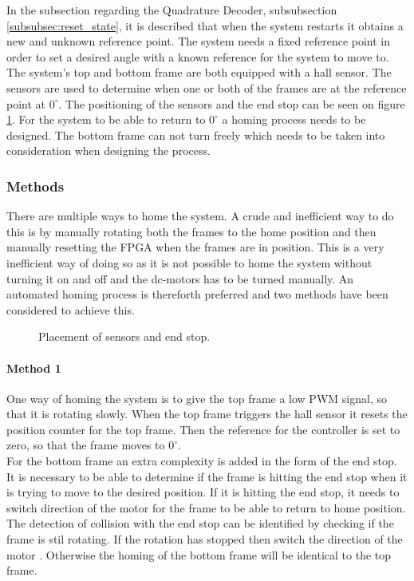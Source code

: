 \documentclass[../../../main]{subfiles}
\begin{document}
In the subsection regarding the Quadrature Decoder, subsubsection \ref{subsubsec:reset_state}, it is described that when the system restarts it obtains a new and unknown reference point.
The system needs a fixed reference point in order to set a desired angle with a known reference for the system to move to.  \\
The system's top and bottom frame are both equipped with a hall sensor.
The sensors are used to determine when one or both of the frames are at the reference point at $0^\circ$. The positioning of the sensors and the end stop can be seen on figure \ref{fig:homing_system}.
For the system to be able to return to $0^\circ$ a homing process needs to be designed.
The bottom frame can not turn freely which needs to be taken into consideration when designing the process.
\subsubsection{Methods} 
There are multiple ways to home the system. A crude and inefficient way to do this is by manually rotating both the frames to the home position and then manually resetting the FPGA when the frames are in position.
This is a very inefficient way of doing so as it is not possible to home the system without turning it on and off and the dc-motors has to be turned manually.
An automated homing process is thereforth preferred and two methods have been considered to achieve this.

\begin{figure}[H]
  \centering
  \def\svgwidth{\textwidth}
  
  \caption{Placement of sensors and end stop.}
  \label{fig:homing_system}
\end{figure}

\paragraph{Method 1}%
\label{par:method_1}
One way of homing the system is to give the top frame a low PWM signal, so that it is rotating slowly.
When the top frame triggers the hall sensor it resets the position counter for the top frame.
Then the reference for the controller is set to zero, so that the frame moves to $0^\circ$. 
\\
For the bottom frame an extra complexity is added in the form of the end stop. It is necessary to be able to determine if the frame is hitting the end stop when it is trying to move to the desired position.
If it is hitting the end stop, it needs to switch direction of the motor for the frame to be able to return to home position.
The detection of collision with the end stop can be identified by checking if the frame is stil rotating. If the rotation has stopped then switch the direction of the motor .
Otherwise the homing of the bottom frame will be identical to the top frame.
\end{document}

